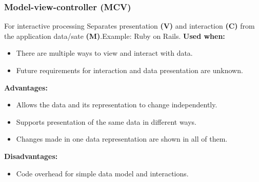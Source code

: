 \documentclass[../ESOF_notes.tex]{subfiles}
\begin{document}
\subsubsection{Model-view-controller (MCV)}
For interactive processing
Separates presentation \textbf{(V)} and interaction \textbf{(C)} from the application data/sate \textbf{(M)}.\newline Example: Ruby on Rails.\newline\newline
\textbf{Used when:}
\begin{itemize}
    \item There are multiple ways to view and interact with data.
    \item Future requirements for interaction and data presentation are unknown.
\end{itemize} \textbf{Advantages:}
\begin{itemize}
    \item Allows the data and its representation to change independently.
    \item Supports presentation of the same data in different ways.
    \item Changes made in one data representation are shown in all of them.
\end{itemize}
\textbf{Disadvantages:}
\begin{itemize}
    \item Code overhead for simple data model and interactions.
\end{itemize}
\end{document}
